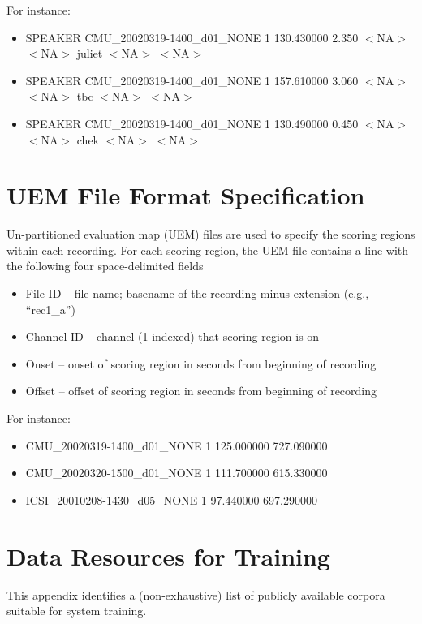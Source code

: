 \documentclass{article}
\begin{document}
\begin{appendices}
For instance:
\begin{itemize}
    \item []SPEAKER CMU_20020319-1400_d01_NONE 1 130.430000 2.350 $<$NA$>$ $<$NA$>$ juliet $<$NA$>$ $<$NA$>$
    \item[] SPEAKER CMU_20020319-1400_d01_NONE 1 157.610000 3.060 $<$NA$>$ $<$NA$>$ tbc $<$NA$>$ $<$NA$>$
    \item[] SPEAKER CMU_20020319-1400_d01_NONE 1 130.490000 0.450 $<$NA$>$ $<$NA$>$ chek $<$NA$>$ $<$NA$>$
\end{itemize}




\newpage
\section{UEM File Format Specification}
\label{app:uem}
Un-partitioned evaluation map (UEM) files are used to specify the scoring regions within each recording. For each scoring region, the UEM file contains a line with the following four space-delimited fields
\begin{itemize}
    \item File ID  --  file name; basename of the recording minus extension (e.g., ``rec1_a'')
    \item Channel ID  --  channel (1-indexed) that scoring region is on
    \item Onset  --  onset of scoring region in seconds from beginning of recording
    \item Offset  --  offset of scoring region in seconds from beginning of recording
\end{itemize}

For instance:
\begin{itemize}
    \item[] CMU_20020319-1400_d01_NONE 1 125.000000 727.090000
    \item[] CMU_20020320-1500_d01_NONE 1 111.700000 615.330000
    \item[] ICSI_20010208-1430_d05_NONE 1 97.440000 697.290000
\end{itemize}



\newpage
\section{Data Resources for Training}
\label{app:data}
This appendix identifies a (non-exhaustive) list of publicly available corpora suitable for system training.



\end{appendices}
\end{document}
